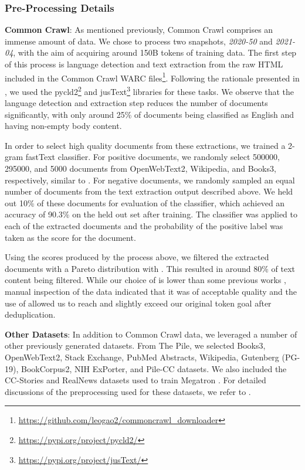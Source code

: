 \documentclass[11pt]{article}
\begin{document}
\subsubsection{Pre-Processing Details}
\label{preprocessing-details}
\textbf{Common Crawl}: As mentioned previously, Common Crawl comprises an immense amount of data. We chose to process two snapshots, \textit{2020-50} and \textit{2021-04}, with the aim of acquiring around 150B tokens of training data. The first step of this process is language detection \cite{danilk-2021-langdetect} and text extraction from the raw HTML included in the Common Crawl WARC files\footnote{\url{https://github.com/leogao2/commoncrawl\_downloader}}. Following the rationale presented in \citep{danilk-2021-langdetect}, we used the pycld2\footnote{\url{https://pypi.org/project/pycld2/}} and jusText\footnote{\url{https://pypi.org/project/jusText/}} libraries for these tasks. We observe that the language detection and extraction step reduces the number of documents significantly, with only around 25\% of documents being classified as English and having non-empty body content.

In order to select high quality documents from these extractions, we trained a 2-gram fastText \citep{ortizsuarez:hal-02148693} classifier. For positive documents, we randomly select 500000, 295000, and 5000 documents from OpenWebText2, Wikipedia, and Books3, respectively, similar to \cite{brown2020language}. 
For negative documents, we randomly sampled an equal number of documents from the text extraction output described above. We held out 10\% of these documents for evaluation of the classifier, which achieved an accuracy of 90.3\% on the held out set after training. The classifier was applied to each of the extracted documents and the probability of the positive label was taken as the score for the document.

Using the scores produced by the process above, we filtered the extracted documents with a Pareto distribution with . This resulted in around 80\% of text content being filtered. While our choice of  is lower than some previous works \citep{brown2020language}, manual inspection of the data indicated that it was of acceptable quality and the use of  allowed us to reach and slightly exceed our original token goal after deduplication.








\textbf{Other Datasets}: In addition to Common Crawl data, we leveraged a number of other previously generated datasets. From The Pile, we selected Books3, OpenWebText2, Stack Exchange, PubMed Abstracts, Wikipedia, Gutenberg (PG-19), BookCorpus2, NIH ExPorter, and Pile-CC datasets. We also included the CC-Stories and RealNews datasets used to train Megatron \citep{megatron-DBLP:journals/corr/abs-1909-08053}. For detailed discussions of the preprocessing used for these datasets, we refer to \cite{pile-dataset-2020}.
\end{document}
